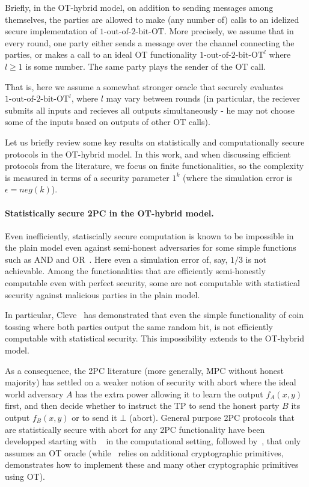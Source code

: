 \documentclass[a4paper]{article}
\newcommand{\OT}[2]{#1\text{-out-of-}#2\text{-bit-OT}}
\begin{document}
Briefly, in the OT-hybrid model, on addition to sending messages among themselves, the parties are allowed to make (any number of) calls to an idelized secure implementation of $\OT{1}{2}$. 
More precisely, we assume that in every round, one party either sends a message over the channel connecting the parties, or makes a call to an ideal OT functionality ${\OT{1}{2}}^l$ where $l\geq 1$
is some number. The same party plays the sender of the OT call.

That is, here we assume a somewhat stronger oracle that securely evaluates ${\OT{1}{2}}^l$, where $l$ may vary between rounds (in particular, the reciever submits all inputs and recieves all outputs simultaneously - he may not choose some of the inputs based on outputs of other OT calls).

Let us briefly review some key results on statistically and computationally secure protocols in the OT-hybrid model. %
In this work, and when discussing efficient protocols from the literature, we focus on finite functionalities, so the complexity is measured in terms of a security parameter $1^k$ (where the simulation error is $\epsilon = neg(k)$).
 
\paragraph{Statistically secure 2PC in the OT-hybrid model.} Even inefficiently, statiscially secure computation is known to be impossible in the plain model even against semi-honest adversaries for some simple functions such as AND and OR~\cite{CK89}.
Here even a simulation error of, say, $1/3$ is not achievable.
Among the functionalities that are efficiently semi-honestly computable even with perfect security, some are not computable with statistical security against malicious parties in the plain model.

In particular, Cleve~\cite{Cleve86} has demonstrated that even the simple functionality of coin tossing where both parties output the same random bit, is not efficiently computable with statistical security. This impossibility extends to the OT-hybrid model.

As a consequence, the 2PC literature (more generally, MPC without honest majority) has settled on a weaker notion of security with abort where the ideal world adversary $A$ has the extra power allowing it to learn the output $f_A(x,y)$ first, and then decide whether to instruct the TP to send the honest party $B$ its output $f_B(x,y)$ or to send it $\bot$ (abort). General purpose 2PC protocols that are statistically secure with abort for any 2PC functionality have been developped starting with ~\cite{GMW91} in the computational setting, followed by~\cite{Killian88}, that only assumes an OT oracle (while~\cite{GMW91} relies on additional cryptographic primitives,\cite{Killian88} demonstrates how to implement these and many other cryptographic primitives using OT). 
\end{document}
